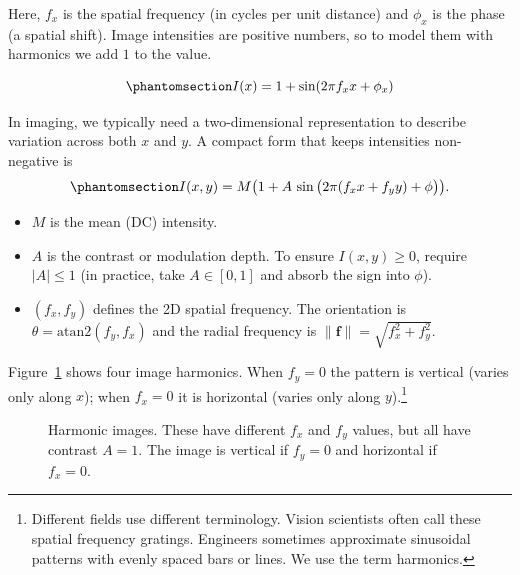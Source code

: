 \documentclass[
  letterpaper,
]{book}
\providecommand{\tightlist}{%
  \setlength{\itemsep}{0pt}\setlength{\parskip}{0pt}}\usepackage{longtable,booktabs,array}
\begin{document}
Here, \(f_x\) is the spatial frequency (in cycles per unit distance) and
\(\phi_x\) is the phase (a spatial shift). Image intensities are
positive numbers, so to model them with harmonics we add \(1\) to the
value.

\begin{equation}\phantomsection\label{eq-harmonics-1d-v2}{
I(x) = 1 + \sin(2\pi f_x x + \phi_x)
}\end{equation}

In imaging, we typically need a two-dimensional representation to
describe variation across both \(x\) and \(y\). A compact form that
keeps intensities non-negative is
\begin{equation}\phantomsection\label{eq-harmonics-2d}{
I(x,y) = M\big(1 + A \,\sin\big(2\pi (f_x x + f_y y) + \phi\big)\big).
}\end{equation}

\begin{itemize}
\tightlist
\item
  \(M\) is the mean (DC) intensity.
\item
  \(A\) is the contrast or modulation depth. To ensure \(I(x,y)\ge0\),
  require \(|A|\le 1\) (in practice, take \(A\in[0,1]\) and absorb the
  sign into \(\phi\)).
\item
  \((f_x,f_y)\) defines the 2D spatial frequency. The orientation is
  \(\theta=\mathrm{atan2}(f_y,f_x)\) and the radial frequency is
  \(\| \mathbf{f} \| = \sqrt{f_x^2+f_y^2}\).
\end{itemize}

Figure~\ref{fig-optics-harmonics-2d} shows four image harmonics. When
\(f_y = 0\) the pattern is vertical (varies only along \(x\)); when
\(f_x = 0\) it is horizontal (varies only along \(y\)).\footnote{Different
  fields use different terminology. Vision scientists often call these
  spatial frequency gratings. Engineers sometimes approximate sinusoidal
  patterns with evenly spaced bars or lines. We use the term harmonics.}

\begin{figure}


\caption{\label{fig-optics-harmonics-2d}Harmonic images. These have
different \(f_x\) and \(f_y\) values, but all have contrast \(A=1\). The
image is vertical if \(f_y = 0\) and horizontal if \(f_x = 0\).}

\end{figure}%
\end{document}
